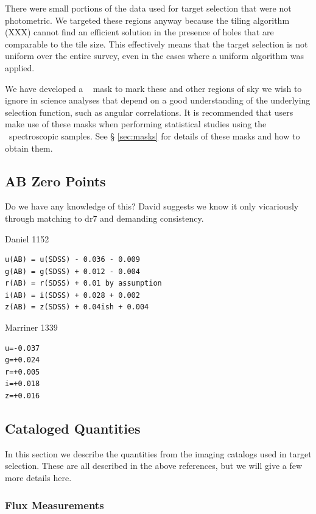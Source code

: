 \documentclass[12pt,preprint]{aastex}
\begin{document}
There were small portions of the data used for target selection that were not
photometric.  We targeted these regions anyway because the tiling algorithm
(XXX) cannot find an efficient solution in the presence of holes that are
comparable to the tile size.  This effectively means that the target selection
is not uniform over the entire survey, even in the cases where a uniform
algorithm was applied.  

We have developed a \mangle\ \citep{SwansonMangle08} mask to mark these and
other regions of sky we wish to ignore in science analyses that depend on a
good understanding of the underlying selection function, such as angular
correlations.  It is recommended that users make use of these masks when
performing statistical studies using the \boss\ spectroscopic samples.  See \S
\ref{sec:masks} for details of these masks and how to obtain them. 

\subsection{AB Zero Points}

{\color{red} Do we have any knowledge of this?  David suggests we know it only
vicariously through matching to dr7 and demanding consistency.}

Daniel 1152

\begin{verbatim}
u(AB) = u(SDSS) - 0.036 - 0.009
g(AB) = g(SDSS) + 0.012 - 0.004
r(AB) = r(SDSS) + 0.01 by assumption
i(AB) = i(SDSS) + 0.028 + 0.002
z(AB) = z(SDSS) + 0.04ish + 0.004
\end{verbatim}

Marriner 1339


\begin{verbatim}
u=-0.037
g=+0.024
r=+0.005
i=+0.018
z=+0.016
\end{verbatim}

\subsection{Cataloged Quantities}

In this section we describe the quantities from the imaging catalogs used in
target selection.    These are all described in the above references, but we
will give a few more details here.

\subsubsection{Flux Measurements}
\end{document}
